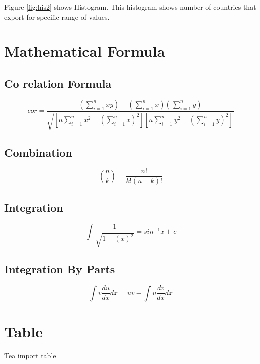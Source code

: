 \documentclass[a4paper,11pt]{article}
\begin{document}
Figure \ref{fig:his2} shows Histogram. This histogram shows number of countries that export for specific range of values.

\newpage
\section{Mathematical Formula}				%
\label{sec:for}

\subsection{Co relation Formula}
\begin{equation}
cor=
\frac{(\sum_{i=1}^{n}xy)-(\sum_{i=1}^{n}x)(\sum_{i=1}^{n}y)}
{\sqrt{[n\sum_{i=1}^{n}x^2-(\sum_{i=1}^{n}x)^2][n\sum_{i=1}^{n}y^2-(\sum_{i=1}^{n}y)^2]}}
\label{for1}
\end{equation}

\subsection{Combination}

\begin{equation}
\binom nk = \frac{n!}{k!(n-k)!}
\label{for2}
\end{equation}

\subsection{Integration}
\begin{equation}
\int\frac{1}{\sqrt{1-(x)^2}}=sin^{-1}x+c
\label{for3}
\end{equation}

\subsection{Integration By Parts}
\begin{equation}
\int{v\frac{du}{dx}dx}=uv- \int{u\frac{dv}{dx}dx}
\label{for4}
\end{equation}

\section{Table}					%
\label{sec:tab}
\begin{table}[H]
\centering
\resizebox{0.60\width}{!}{}
\caption{Tea import table}
\label{tab1}
\end{table}
\end{document}
